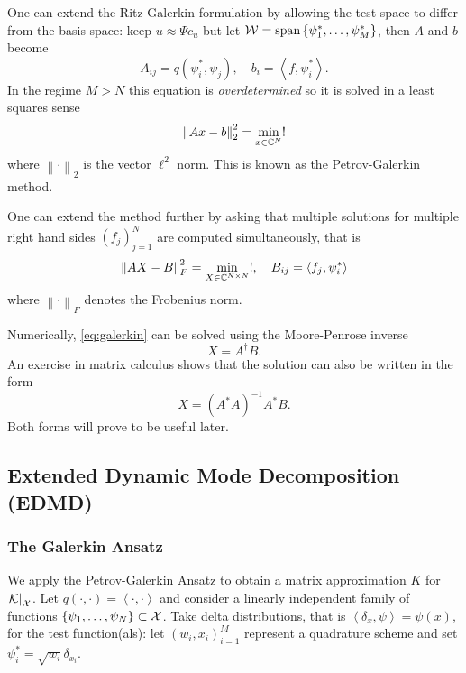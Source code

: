 One can extend the Ritz-Galerkin formulation by allowing the test space to differ from 
the basis space: keep $u \approx \Psi c_u$ but let 
$\mathcal{W} = \text{span} \left\{ \psi^*_1, \ldots, \psi^*_M \right\}$, then $A$ and $b$ become 
\begin{equation}
    A_{i j} = q( \psi^*_i, \psi_j ), \quad 
    b_i = \left\langle f, \psi^*_i \right\rangle . 
\end{equation}
In the regime $M > N$ this equation is \emph{overdetermined} so it is solved in a least 
squares sense
\begin{equation}
    \left\| A x - b \right\|_2^2 = \min_{x \in \mathbb{C}^N} !
\end{equation}
where $\left\| \cdot \right\|_2$ is the vector $\ell^2$ norm. This is known as the 
Petrov-Galerkin method. 

One can extend the method further by asking that multiple solutions for multiple right 
hand sides $(f_j)_{j=1}^N$ are computed simultaneously, that is 
\begin{equation}
    \label{eq:galerkin}
    \left\| A X - B \right\|_F^2 = \min_{X \in \mathbb{C}^{N \times N}} !, \quad 
    B_{i j} = \left\langle f_j, \psi^*_i \right\rangle 
\end{equation}
where $\left\| \cdot \right\|_F$ denotes the Frobenius norm. 

Numerically, \ref{eq:galerkin} can be solved using the Moore-Penrose inverse
\begin{equation}
    \label{eq:moore_penrose}
    X = A^\dagger B . 
\end{equation}
An exercise in matrix calculus shows that the solution can also be written in the form 
\begin{equation}
    \label{eq:adjoint_inverse}
    X = (A^* A)^{-1} A^* B . 
\end{equation}
Both forms will prove to be useful later. 


\subsection{Extended Dynamic Mode Decomposition (EDMD)}


\subsubsection{The Galerkin Ansatz}

We apply the Petrov-Galerkin Ansatz to obtain a matrix approximation $K$ 
for $\left. \mathcal{K} \right|_{\mathcal{X}}$. Let 
$q(\cdot, \cdot) = \left\langle \cdot, \cdot \right\rangle$ and consider a linearly 
independent family of functions $\left\{ \psi_1, \ldots, \psi_N \right\} \subset \mathcal{X}$. 
Take delta distributions, that is $\left\langle \delta_x, \psi \right\rangle = \psi (x)$, 
for the test function(als): let $(w_i, x_i)_{i=1}^M$ represent a quadrature scheme and 
set $\psi_i^* = \sqrt{w_i} \delta_{x_i}$. 

